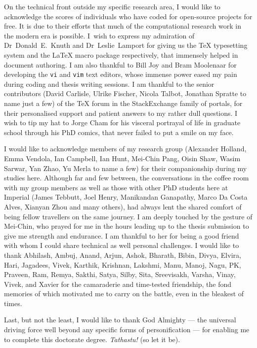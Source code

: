 On the technical front outside my specific research area, I would like to
acknowledge the scores of individuals who have coded for open-source projects
for free. It is due to their efforts that much of the computational research
work in the modern era is possible. I~wish to express my admiration of
\mbox{Dr~Donald E.\ Knuth} and \mbox{Dr~Leslie Lamport} for giving us the \TeX{}
typesetting system and the \LaTeX{} macro package respectively, that immensely helped
in document authoring. I am also thankful to Bill Joy
and Bram Moolenaar for developing the \texttt{vi} and \texttt{vim} text editors,
whose immense power eased my pain during coding and thesis writing sessions. I
am thankful to the senior contributors (David Carlisle, Ulrike Fischer, Nicola
Talbot, Jonathan Spratte to name just a few) of the TeX forum in the
StackExchange family of portals, for their personalised support and patient
answers to my rather dull questions. I wish to tip my hat to Jorge Cham for his
visceral portrayal of life in graduate school through his PhD comics, that never
failed to put a smile on my face.

\addlines[2]

I would like to acknowledge members of my research group (Alexander Holland,
Emma Vendola, Ian Campbell, Ian Hunt, Mei-Chin Pang, Oisin Shaw, Wasim Sarwar,
Yan Zhao, Yu Merla to name a few) for their companionship during my studies
here. Although far and few between, the conversations in the coffee room with my
group members as well as those with other PhD students here at Imperial (James
Tebbutt, Joel Henry, Manikandan Ganapathy, Marco Da Costa Alves, Xianyan Zhou
and many others), had always lent the shared comfort of being fellow travellers
on the same journey. I am deeply touched by the gesture of Mei-Chin, who prayed
for me  in the hours leading up to the thesis submission to give me strength and
endurance. I am thankful to her for being a good friend with whom I could share
technical as well personal challenges. I would like to thank Abhilash, Ambuj,
Anand, Arjun, Ashok, Bharath, Bibin, Divya, Elvira, Hari, Jagadees, Vivek,
Karthik, Krishnan, Lakshmi, Manu, Manoj, Nagu, PK, Praveen, Ram, Remya, Sakthi,
Satya, Silby, Sita, Sreevisakh, Varsha, Vinay, Vivek, and Xavier for the
camaraderie and time-tested friendship, the fond memories of which motivated me
to carry on the  battle, even in the bleakest of times.

Last, but not the least, I would like to thank God Almighty --- the universal
driving force well beyond any specific forms of personification --- for enabling
me to complete this doctorate degree. \emph{Tathastu!} (so let it be).

